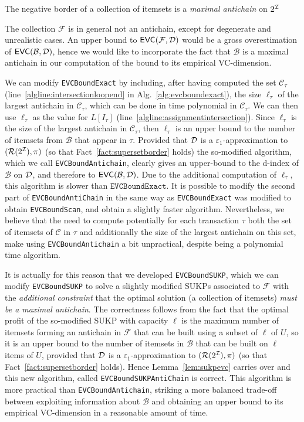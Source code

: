 \begin{fact}
	The negative border of a collection of itemsets is a \emph{maximal
	antichain} on $2^{\cal I}$
\end{fact}

The collection $\mathcal{F}$ is in general not an antichain, except for
degenerate and unrealistic cases. An upper bound to $\mathsf{EVC}(\mathcal{F},{\cal D})$
would be a gross overestimation of $\mathsf{EVC}(\mathcal{B},{\cal D})$, hence we would like
to incorporate the fact that $\mathcal{B}$ is a maximal antichain in our
computation of the bound to its empirical VC-dimension.

We can modify \texttt{EVCBoundExact} by including, after having computed the
set $\mathcal{C}_\tau$ (line~\ref{algline:intersectionloopend} in
Alg.~\ref{alg:evcboundexact}), the size $\ell_\tau$ of the largest antichain in
$\mathcal{C}_\tau$, which can be done in time polynomial in $\mathcal{C}_\tau$.
We can then use $\ell_\tau$ as the value for $L[I_\tau]$
(line~\ref{algline:assignmentintersection}). Since $\ell_\tau$ is the size of
the largest antichain in $\mathcal{C}_\tau$, then $\ell_\tau$ is an upper bound
to the number of itemsets from $\mathcal{B}$ that appear in $\tau$. Provided
that ${\cal D}$ is a $\varepsilon_1$-approximation to $(\mathcal{R}(2^{\cal I}),\pi)$ (so
that Fact~\ref{fact:supersetborder} holds) the so-modified algorithm, which we
call \texttt{EVCBoundAntichain}, clearly gives an upper-bound to the d-index of
$\mathcal{B}$ on ${\cal D}$, and therefore to $\mathsf{EVC}(\mathcal{B},{\cal D})$. Due to the
additional computation of $\ell_\tau$, this algorithm is slower than
$\texttt{EVCBoundExact}$. It is possible to modify the second part of
\texttt{EVCBoundAntiChain} in the same way as \texttt{EVCBoundExact} was
modified to obtain \texttt{EVCBoundScan}, and obtain a slightly faster
algorithm. Nevertheless, we believe that the need to compute potentially for
each transaction $\tau$ both the set of itemsets of $\mathcal{C}$ in $\tau$ and
additionally the size of the largest antichain on this set, make using
\texttt{EVCBoundAntichain} a bit unpractical, despite being a polynomial time
algorithm.

It is actually for this reason that we developed \texttt{EVCBoundSUKP}, which we
can modify \texttt{EVCBoundSUKP} to solve a slightly modified SUKPs associated
to $\mathcal{F}$ with the \emph{additional constraint} that the optimal solution
(a collection of itemsets) \emph{must be a maximal antichain}. The correctness
follows from the fact that the optimal profit of the so-modified SUKP with
capacity $\ell$ is the maximum number of itemsets forming an antichain in
$\mathcal{F}$ that can be built using a subset of $\ell$ of $U$, so it is an
upper bound to the number of itemsets in $\mathcal{B}$ that can be built on
$\ell$ items of $U$, provided that ${\cal D}$ is a $\varepsilon_1$-approximation to
$(\mathcal{R}(2^{\cal I}),\pi)$ (so that Fact~\ref{fact:supersetborder} holds). Hence
Lemma~\ref{lem:sukpevc} carries over and this new algorithm, called
\texttt{EVCBoundSUKPAntiChain} is correct. This algorithm is more practical than
\texttt{EVCBoundAntichain}, striking a more balanced trade-off between
exploiting information about $\mathcal{B}$ and obtaining an upper bound to its
empirical VC-dimension in a reasonable amount of time.

